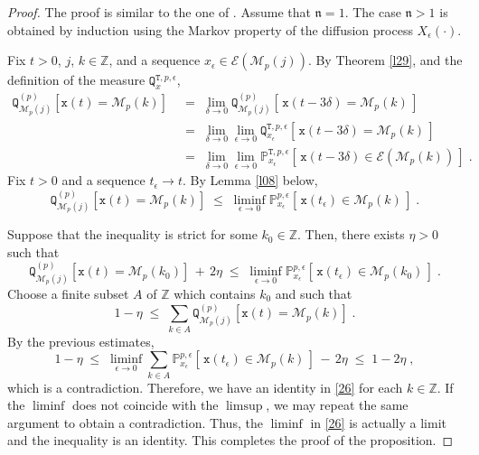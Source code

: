 \documentclass[reqno]{amsart}
\theoremstyle{plain}
\theoremstyle{definition}
\newcommand{\mc}[1]{{\mathcal #1}}
\newcommand{\mf}[1]{{\mathfrak #1}}
\newcommand{\bb}[1]{{\mathbb #1}}
\newcommand{\ms}[1]{{\mathscr #1}}
\newcommand{\mtt}[1]{{\mathtt #1}}
\newcounter{as}[section]
\newcommand{\<}{\langle}
\renewcommand{\>}{\rangle}
\begin{document}
\begin{proof}
The proof is similar to the one of \cite[Proposition 2.1]{llm}.
Assume that $\mf n=1$. The case $\mf n>1$ is obtained by induction
using the Markov property of the diffusion process
$X_\epsilon(\cdot)$.

Fix $t>0$, $j$, $k \in \bb Z$, and a sequence $x_\epsilon \in \mc E(\ms
M_p(j))$. By Theorem \ref{l29}, and the definition of the measure
$\mtt Q^{{\mtt T}, p, \epsilon}_x$,
\begin{equation*}
\begin{aligned}
{\mtt Q}_{\ms M_p(j)}^{(p)} [ \mtt x (t) = \ms M_p(k)]
\; & =\; \lim_{\delta \to 0}
{\mtt Q}_{\ms M_p(j)}^{(p)}
[ \, \mtt x (t-3\delta) = \ms M_p(k) \, ]
\\
\; & =\; \lim_{\delta \to 0}
\lim_{\epsilon \to 0}
\mtt Q^{{\mtt T}, p, \epsilon} _{x_\epsilon}
[ \, \mtt x  (t-3\delta) =  \ms M_p(k) \, ]
\\
\; & =\; \lim_{\delta \to 0}
\lim_{\epsilon \to 0}
\bb P^{{\mtt T} , p, \epsilon} _{x_\epsilon}
[ \, \mtt x  (t-3\delta) \in   \ms E(\ms M_p(k)) \, ]
\;.
\end{aligned}
\end{equation*}
Fix $t>0$ and a sequence $t_\epsilon\to t$. By Lemma \ref{l08} below,
\begin{equation}
\label{26}
{\mtt Q}_{\ms M_p(j)}^{(p)} [ \mtt x (t) = \ms M_p(k)]
\;\le \;
\liminf_{\epsilon\to 0}
\bb P^{p, \epsilon} _{x_\epsilon}
[ \, \mtt x  (t_\epsilon) \in  \ms M_p(k) \, ]\;.
\end{equation}

Suppose that the inequality is strict for some $k_0\in \bb Z$.
Then, there exists $\eta>0$ such that
\begin{equation*}
{\mtt Q}_{\ms M_p(j)}^{(p)} [ \mtt x (t) = \ms M_p(k_0)] \,+\, 2 \eta
\;\le \;
\liminf_{\epsilon\to 0}
\bb P^{p, \epsilon} _{x_\epsilon}
[ \, \mtt x  (t_\epsilon) \in  \ms M_p(k_0) \, ]\;.
\end{equation*}
Choose a finite subset $A$ of $\bb Z$ which contains $k_0$ and such
that
\begin{equation*}
1 - \eta \; \le \; \sum_{k\in A}
{\mtt Q}_{\ms M_p(j)}^{(p)} [ \mtt x (t) = \ms M_p(k)]\;.
\end{equation*}
By the previous estimates,
\begin{equation*}
1 - \eta \; \le \;
\liminf_{\epsilon\to 0} \sum_{k\in A}
\bb P^{p, \epsilon} _{x_\epsilon}
[ \, \mtt x  (t_\epsilon) \in  \ms M_p(k) \, ]
\,-\, 2\eta \;\le\; 1 - 2\eta\;,
\end{equation*}
which is a contradiction. Therefore, we have an identity in
\eqref{26} for each $k\in\bb Z$. If the $\liminf$ does not coincide
with the $\limsup$, we may repeat the same argument to obtain a
contradiction. Thus, the $\liminf$ in \eqref{26} is actually a limit
and the inequality is an identity. This completes the proof of the
proposition. 
\end{proof}
\end{document}
